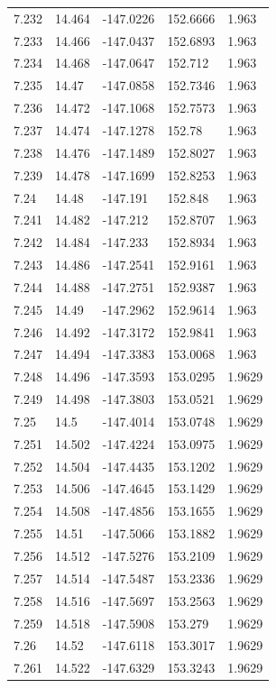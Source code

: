 \begin{tabular}{lllll}
7.232 & 14.464 & -147.0226 & 152.6666 & 1.963 \\
7.233 & 14.466 & -147.0437 & 152.6893 & 1.963 \\
7.234 & 14.468 & -147.0647 & 152.712 & 1.963 \\
7.235 & 14.47 & -147.0858 & 152.7346 & 1.963 \\
7.236 & 14.472 & -147.1068 & 152.7573 & 1.963 \\
7.237 & 14.474 & -147.1278 & 152.78 & 1.963 \\
7.238 & 14.476 & -147.1489 & 152.8027 & 1.963 \\
7.239 & 14.478 & -147.1699 & 152.8253 & 1.963 \\
7.24 & 14.48 & -147.191 & 152.848 & 1.963 \\
7.241 & 14.482 & -147.212 & 152.8707 & 1.963 \\
7.242 & 14.484 & -147.233 & 152.8934 & 1.963 \\
7.243 & 14.486 & -147.2541 & 152.9161 & 1.963 \\
7.244 & 14.488 & -147.2751 & 152.9387 & 1.963 \\
7.245 & 14.49 & -147.2962 & 152.9614 & 1.963 \\
7.246 & 14.492 & -147.3172 & 152.9841 & 1.963 \\
7.247 & 14.494 & -147.3383 & 153.0068 & 1.963 \\
7.248 & 14.496 & -147.3593 & 153.0295 & 1.9629 \\
7.249 & 14.498 & -147.3803 & 153.0521 & 1.9629 \\
7.25 & 14.5 & -147.4014 & 153.0748 & 1.9629 \\
7.251 & 14.502 & -147.4224 & 153.0975 & 1.9629 \\
7.252 & 14.504 & -147.4435 & 153.1202 & 1.9629 \\
7.253 & 14.506 & -147.4645 & 153.1429 & 1.9629 \\
7.254 & 14.508 & -147.4856 & 153.1655 & 1.9629 \\
7.255 & 14.51 & -147.5066 & 153.1882 & 1.9629 \\
7.256 & 14.512 & -147.5276 & 153.2109 & 1.9629 \\
7.257 & 14.514 & -147.5487 & 153.2336 & 1.9629 \\
7.258 & 14.516 & -147.5697 & 153.2563 & 1.9629 \\
7.259 & 14.518 & -147.5908 & 153.279 & 1.9629 \\
7.26 & 14.52 & -147.6118 & 153.3017 & 1.9629 \\
7.261 & 14.522 & -147.6329 & 153.3243 & 1.9629 \\

\end{tabular}
